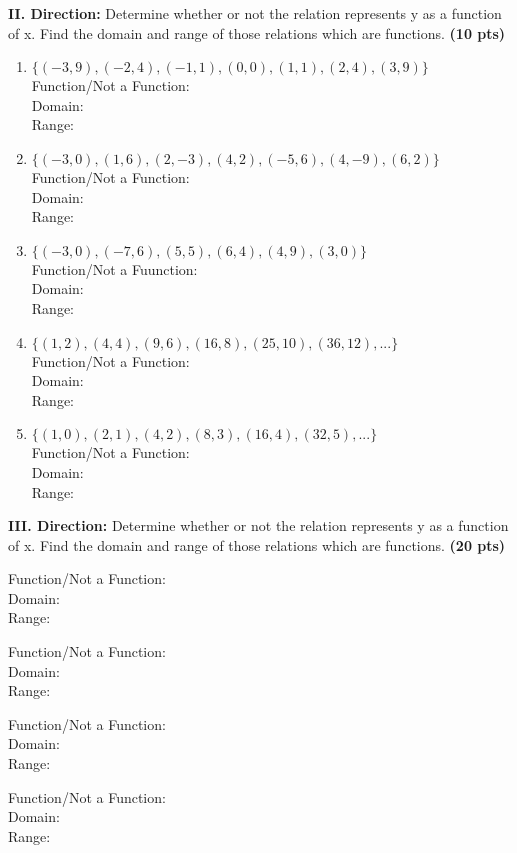 \documentclass[11pt]{article}
\begin{document}
\noindent \textbf{II. Direction:} Determine whether or not the relation represents y as a function of x. Find the domain and range of those relations which are functions.
 \textbf{(10 pts)}
\begin{enumerate}
\item$\{(-3,9), (-2,4), (-1,1), (0,0), (1,1), (2,4), (3,9)\}$\\Function/Not a Function:\\Domain:\\Range:
\item$\{(-3,0),(1,6),(2,-3),(4,2),(-5,6),(4,-9),(6,2)\}$\\Function/Not a Function:\\Domain:\\Range:
\item$\{(-3,0),(-7,6),(5,5),(6,4),(4,9),(3,0)\}$\\Function/Not a Fuunction:\\Domain:\\Range:
\item$\{(1,2),(4,4),(9,6),(16,8),(25,10),(36,12),...\}$\\Function/Not a Function:\\Domain:\\Range:
\item$\{(1,0), (2,1), (4,2), (8,3), (16,4), (32,5), ...\}$\\Function/Not a Function:\\Domain:\\Range:


\end{enumerate}

\noindent \textbf{III. Direction:} Determine whether or not the relation represents y as a function of x. Find the domain and range of those relations which are functions.
 \textbf{(20 pts)}
\begin{enumerate}
\begin{multicols}{2}
\item
Function/Not a Function:\\Domain:\\Range:\\
  \item
Function/Not a Function:\\Domain:\\Range:\\
  \item
Function/Not a Function:\\Domain:\\Range:\\
  \item
Function/Not a Function:\\Domain:\\Range:\\
  \end{multicols}
\end{enumerate}
\end{document}
